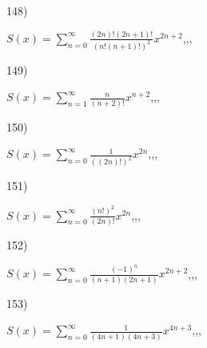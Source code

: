 \documentclass[11pt, ukrainian]{article}
\begin{document}
\par
\vspace{0.9cm}
148) \space 
{%
{$S(x)=\sum\limits_{n=0}^{\infty}{\frac{(2n)!(2n+1)!}{(n!(n+1)!)^2}}{x^{{2n+2}}}$},,, \par \smallskip  
}
\par
\vspace{0.9cm}
149) \space 
{%
{$S(x)=\sum\limits_{n=1}^{\infty}{\frac{n}{(n+2)!}}{x^{{n+2}}}$},,, \par \smallskip  
}
\par
\vspace{0.9cm}
150) \space 
{%
{$S(x)=\sum\limits_{n=0}^{\infty}{\frac{1}{((2n)!)^2}}{x^{{2n}}}$},,, \par \smallskip  
}
\par
\newpage
151) \space 
{%
{$S(x)=\sum\limits_{n=0}^{\infty}{\frac{(n!)^2}{(2n)!}}{x^{{2n}}}$},,, \par \smallskip  
}
\par
\vspace{0.9cm}
152) \space 
{%
{$S(x)=\sum\limits_{n=0}^{\infty}{\frac{(-1)^n}{(n+1)(2n+1)}}{x^{{2n+2}}}$},,, \par \smallskip  
}
\par
\vspace{0.9cm}
153) \space 
{%
{$S(x)=\sum\limits_{n=0}^{\infty}{\frac{1}{(4n+1)(4n+3)}}{x^{{4n+3}}}$},,, \par \smallskip  
}
\end{document}
